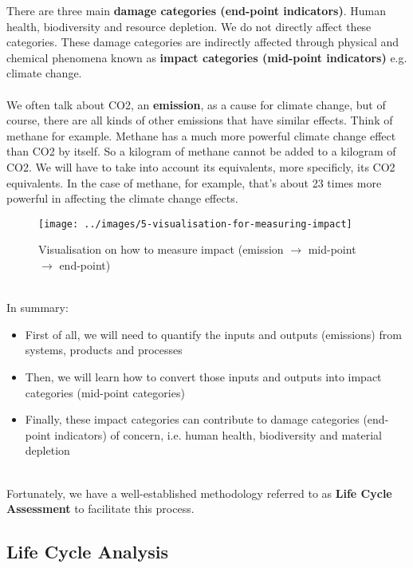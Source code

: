\documentclass[../summary.tex]{subfiles}
\begin{document}
	There are three main \textbf{damage categories (end-point indicators)}. Human health, biodiversity and resource depletion. We do not directly affect these categories. These damage categories are indirectly affected through physical and chemical phenomena known as \textbf{impact categories (mid-point indicators)} e.g. climate change. \\
	\\
	We often talk about CO2, an \textbf{emission}, as a cause for climate change, but of course, there are all kinds of other emissions that have similar effects. Think of methane for example. Methane has a much more powerful climate change effect than CO2 by itself. So a kilogram of methane cannot be added to a kilogram of CO2. We will have to take into account its equivalents, more specificly, its CO2 equivalents. In the case of methane, for example, that's about 23 times more powerful in affecting the climate change effects. 
	
	\begin{figure}[H]
		\centering
		\texttt{[image: ../images/5-visualisation-for-measuring-impact]}
		\caption{Visualisation on how to measure impact (emission $\rightarrow$ mid-point $\rightarrow$ end-point)}
		\label{fig:5-visualisation-for-measuring-impact}
	\end{figure}
	\ \\
	In summary:
	\begin{itemize}
		\item First of all, we will need to quantify the inputs and outputs (emissions) from systems, products and processes
		\item Then, we will learn how to convert those inputs and outputs into impact categories (mid-point categories)
		\item Finally, these impact categories can contribute to damage categories (end-point indicators) of concern, i.e. human health, biodiversity and material depletion
	\end{itemize}
	\ \\
	Fortunately, we have a well-established methodology referred to as \textbf{Life Cycle Assessment} to facilitate this process.
	
	\subsection{Life Cycle Analysis}
	
\end{document}
